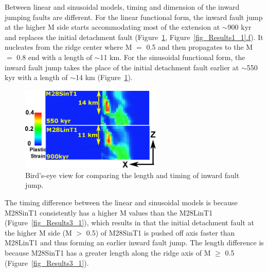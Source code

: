 Between linear and sinusoidal models, timing and dimension of the inward jumping faults are different. For the linear functional form, the inward fault jump at the higher M side starts accommodating most of the extension at $\sim$900 kyr and replaces the initial detachment fault (Figure~\hyperref[fig_Results4_2]{\ref{fig_Results4_2}}, Figure~\hyperref[fig_Results1_1]{\ref{fig_Results1_1}.f}). It nucleates from the ridge center where M $=$ 0.5 and then propagates to the M $=$ 0.8 end with a length of $\sim$11 km. 
For the sinusoidal functional form, the inward fault jump takes the place of the initial detachment fault earlier at $\sim$550 kyr with a length of $\sim$14 km (Figure~\hyperref[fig_Results4_2]{\ref{fig_Results4_2}}).

\begin{figure}[h]
  \centering
    \includegraphics[width=0.6\textwidth]{./Figures/fig_Results4_2_secondary_fault_length_comparison1.eps}
  \caption{Bird's-eye view for comparing the length and timing of inward fault jump.}
 \label{fig_Results4_2}
\end{figure}   

The timing difference between the linear and sinusoidal models is because M28SinT1 consistently has a higher M values than the M28LinT1 (Figure~\hyperref[fig_Results3_1]{\ref{fig_Results3_1}}), which results in that the initial detachment fault at the higher M side (M $>$ 0.5) of M28SinT1 is pushed off axis faster than M28LinT1 and thus forming an earlier inward fault jump. The length difference is because M28SinT1 has a greater length along the ridge axis of M $\ge$ 0.5 (Figure~\hyperref[fig_Results3_1]{\ref{fig_Results3_1}}). 

